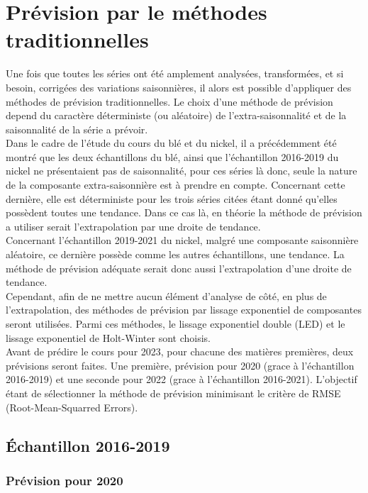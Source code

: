 \section{Prévision par le méthodes traditionnelles}
Une fois que toutes les séries ont été amplement analysées, transformées, et si besoin, corrigées des variations saisonnières, il alors est possible d'appliquer des 
méthodes de prévision traditionnelles. Le choix d'une méthode de prévision depend du caractère déterministe (ou aléatoire) de l'extra-saisonnalité et de la saisonnalité de
la série a prévoir. \\[11pt]
Dans le cadre de l'étude du cours du blé et du nickel, il a précédemment été montré que les deux échantillons du blé, ainsi que l'échantillon 2016-2019 
du nickel ne présentaient pas de saisonnalité, pour ces séries là donc, seule la nature de la composante extra-saisonnière est à prendre en compte. Concernant cette 
dernière, elle est déterministe pour les trois séries citées étant donné qu'elles possèdent toutes une tendance. Dans ce cas là, en théorie la méthode de prévision a 
utiliser serait l'extrapolation par une droite de tendance.\\[11pt]
Concernant l'échantillon 2019-2021 du nickel, malgré une composante saisonnière aléatoire, ce dernière possède comme les autres échantillons, une tendance. La méthode de 
prévision adéquate serait donc aussi l'extrapolation d'une droite de tendance.\\[11pt]
Cependant, afin de ne mettre aucun élément d'analyse de côté, en plus de l'extrapolation, des méthodes de prévision par lissage exponentiel de composantes seront 
utilisées. Parmi ces méthodes, le lissage exponentiel double (LED) et le lissage exponentiel de Holt-Winter sont choisis. \\[11pt]
Avant de prédire le cours pour 2023, pour chacune des matières premières, deux prévisions seront faites. Une première, prévision pour 2020 (grace à l'échantillon 2016-2019)
et une seconde pour 2022 (grace à l'échantillon 2016-2021). L'objectif étant de sélectionner la méthode de prévision minimisant le critère de RMSE (Root-Mean-Squarred 
Errors).
\subsection{Échantillon 2016-2019}
\subsubsection{Prévision pour 2020}
